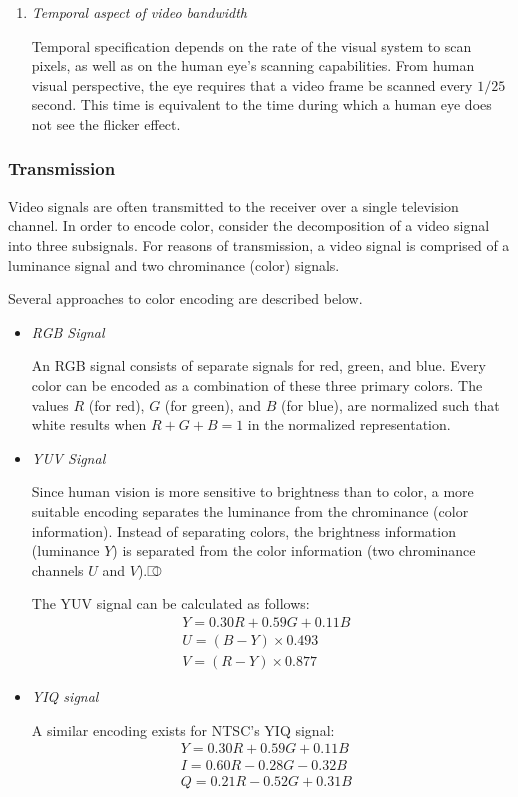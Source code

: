 \begin{enumerate}
\item \textit{Temporal aspect of video bandwidth}

	Temporal specification depends on the rate of the visual system to scan pixels, as well as on the human eye's scanning capabilities. From human visual perspective, the eye requires that a video frame be scanned every $ 1/25 $ second. This time is equivalent to the time during which a human eye does not see the flicker effect.
\end{enumerate}


\subsubsection{Transmission}
Video signals are often transmitted to the receiver over a single television channel. In order to encode color, consider the decomposition of a video signal into three subsignals. For reasons of transmission, a video signal is comprised of a luminance signal and two chrominance (color) signals. 


Several approaches to color encoding are described below.

\begin{itemize}
	\item \textit{RGB Signal}
	
	An RGB signal consists of separate signals for red, green, and blue. Every color can be encoded as a combination of these three primary colors. The values $ R $ (for red), $ G $ (for green), and $ B $ (for blue), are normalized such that white results when $ R+G+B = 1 $ in the normalized representation.
	
	\item \textit{YUV Signal}
	
	Since human vision is more sensitive to brightness than to color, a more suitable encoding separates the luminance from the chrominance (color information). Instead of separating colors, the brightness information (luminance $ Y $) is separated from the color information (two chrominance channels $ U $ and $ V $).⎄
	
	The YUV signal can be calculated as follows:
	\begin{align*}
	 	& Y = 0.30R + 0.59G + 0.11B  \\
	 	& U = (B-Y) \times 0.493  \\
		& V = (R-Y) \times 0.877&&
	\end{align*}

\item \textit{YIQ signal}

A similar encoding exists for NTSC’s YIQ signal:
	\begin{align*}
		& Y = 0.30R + 0.59G + 0.11B \\
		& I = 0.60R - 0.28G - 0.32B  \\
		& Q = 0.21R - 0.52G + 0.31B &&
	\end{align*}
\end{itemize}
